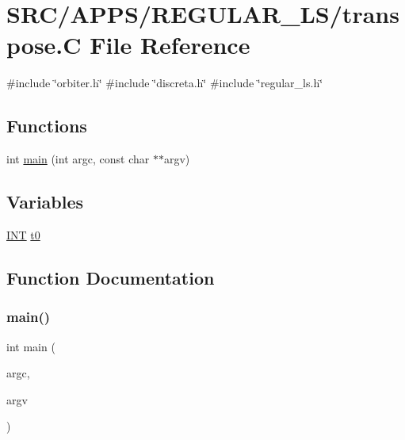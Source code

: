 \hypertarget{transpose_8_c}{}\section{S\+R\+C/\+A\+P\+P\+S/\+R\+E\+G\+U\+L\+A\+R\+\_\+\+L\+S/transpose.C File Reference}
\label{transpose_8_c}
{\ttfamily \#include \char`\"{}orbiter.\+h\char`\"{}}\newline
{\ttfamily \#include \char`\"{}discreta.\+h\char`\"{}}\newline
{\ttfamily \#include \char`\"{}regular\+\_\+ls.\+h\char`\"{}}\newline
\subsection*{Functions}
\begin{DoxyCompactItemize}
\item 
int \mbox{\hyperlink{transpose_8_c_a217dbf8b442f20279ea00b898af96f52}{main}} (int argc, const char $\ast$$\ast$argv)
\end{DoxyCompactItemize}
\subsection*{Variables}
\begin{DoxyCompactItemize}
\item 
\mbox{\hyperlink{galois_8h_a09fddde158a3a20bd2dcadb609de11dc}{I\+NT}} \mbox{\hyperlink{transpose_8_c_a4268f4fe222ffb119218a0199f5e1904}{t0}}
\end{DoxyCompactItemize}


\subsection{Function Documentation}
\mbox{\label{transpose_8_c_a217dbf8b442f20279ea00b898af96f52}} 
\subsubsection{\texorpdfstring{main()}{main()}}
{\footnotesize\ttfamily int main (\begin{DoxyParamCaption}\item[{int}]{argc,  }\item[{const char $\ast$$\ast$}]{argv }\end{DoxyParamCaption})}



